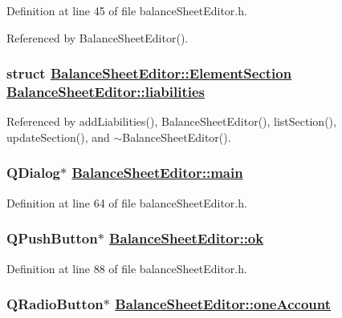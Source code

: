 Definition at line 45 of file balance\-Sheet\-Editor.h.

Referenced by Balance\-Sheet\-Editor().\hypertarget{classBalanceSheetEditor_r5}{
\subsubsection[liabilities]{\setlength{\rightskip}{0pt plus 5cm}struct \hyperlink{structBalanceSheetEditor_1_1ElementSection}{Balance\-Sheet\-Editor::Element\-Section}  \hyperlink{classBalanceSheetEditor_r5}{Balance\-Sheet\-Editor::liabilities}}}
\label{classBalanceSheetEditor_r5}




Referenced by add\-Liabilities(), Balance\-Sheet\-Editor(), list\-Section(), update\-Section(), and $\sim$Balance\-Sheet\-Editor().\hypertarget{classBalanceSheetEditor_r7}{
\subsubsection[main]{\setlength{\rightskip}{0pt plus 5cm}QDialog$\ast$ \hyperlink{classBalanceSheetEditor_r7}{Balance\-Sheet\-Editor::main}}}
\label{classBalanceSheetEditor_r7}


Definition at line 64 of file balance\-Sheet\-Editor.h.\hypertarget{classBalanceSheetEditor_r31}{
\subsubsection[ok]{\setlength{\rightskip}{0pt plus 5cm}QPush\-Button$\ast$ \hyperlink{classBalanceSheetEditor_r31}{Balance\-Sheet\-Editor::ok}}}
\label{classBalanceSheetEditor_r31}


Definition at line 88 of file balance\-Sheet\-Editor.h.\hypertarget{classBalanceSheetEditor_r9}{
\subsubsection[oneAccount]{\setlength{\rightskip}{0pt plus 5cm}QRadio\-Button$\ast$ \hyperlink{classBalanceSheetEditor_r9}{Balance\-Sheet\-Editor::one\-Account}}}
\label{classBalanceSheetEditor_r9}


